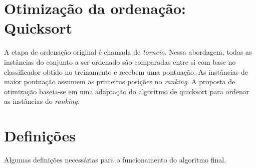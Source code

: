 \section{Otimização da ordenação: Quicksort}
A etapa de ordenação original é chamada de \emph{torneio}. Nessa abordagem, todas as instâncias do conjunto a ser ordenado são comparadas entre si com base no classificador obtido no treinamento e recebem uma pontuação. As instâncias de maior pontuação assumem as primeiras posições no \emph{ranking}. A proposta de otimização baseia-se em uma adaptação do algoritmo de quicksort para ordenar as instâncias do \emph{ranking}.

\section{Definições}
Algumas definições necessárias para o funcionamento do algoritmo final.